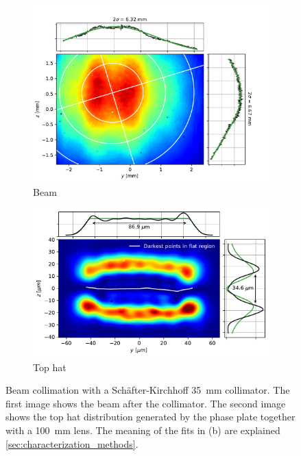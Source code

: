 \begin{figure}[]
    \begin{subfigure}{0.5\textwidth}
        \centering
        \includegraphics[width=\textwidth]{chapters/chapter_3/figures/beam_f35.pdf}
        \caption{Beam}
        \label{fig:beam_f35}
    \end{subfigure}
    \begin{subfigure}{0.5\textwidth}
        \centering
        \includegraphics[width=\textwidth]{chapters/chapter_3/figures/tophat_f35.pdf}
        \caption{Top hat}
        \label{fig:beam_f37.5}
    \end{subfigure}
    \caption{Beam collimation with a Schäfter-Kirchhoff \SI{35}{mm} collimator. The first image shows the beam after the collimator. The second image shows the top hat distribution generated by the phase plate together with a \SI{100}{mm} lens. The meaning of the fits in (b) are explained \cref{sec:characterization_methods}.}
    \label{fig:collimator}
\end{figure}

